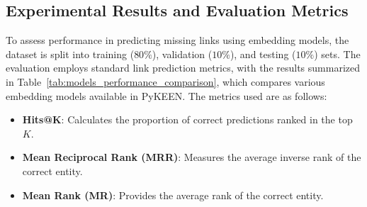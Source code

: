 \subsection*{Experimental Results and Evaluation Metrics}

To assess performance in predicting missing links using embedding models, the dataset is split into training ($80\%$), validation ($10\%$), and testing ($10\%$) sets. The evaluation employs standard link prediction metrics, with the results summarized in Table~\ref{tab:models_performance_comparison}, which compares various embedding models available in PyKEEN. The metrics used are as follows:

\begin{itemize}
    \item \textbf{Hits@K}: Calculates the proportion of correct predictions ranked in the top $K$. %
    \item \textbf{Mean Reciprocal Rank (MRR)}: Measures the average inverse rank of the correct entity. %
    \item \textbf{Mean Rank (MR)}: Provides the average rank of the correct entity. %
\end{itemize}




%
%
%

